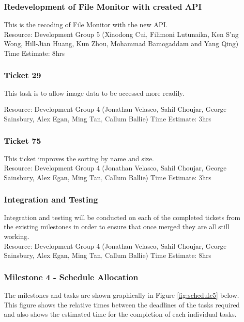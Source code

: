 \documentclass{article}
\begin{document}
\subsubsection{Redevelopment of File Monitor with created API}
	This is the recoding of File Monitor with the new API.\\
	
	Resource: Development Group 5 (Xiaodong Cui, Filimoni Lutunaika, Ken S'ng Wong, Hill-Jian Huang, Kun Zhou, Mohammad Bamogaddam and Yang Qing)
	Time Estimate: 8hrs
	
\subsubsection{Ticket 29}
	This task is to allow image data to be accessed more readily.
	
	Resource: Development Group 4 (Jonathan Velasco, Sahil Choujar, George Sainsbury, Alex Egan, Ming Tan, Callum Ballie)
	Time Estimate: 3hrs

\subsubsection{Ticket 75}
	This ticket improves the sorting by name and size.\\
	
	Resource: Development Group 4 (Jonathan Velasco, Sahil Choujar, George Sainsbury, Alex Egan, Ming Tan, Callum Ballie)
	Time Estimate: 3hrs

\subsubsection{Integration and Testing}
	Integration and testing will be conducted on each of the completed tickets from the existing milestones in order to ensure that once merged they are all still working.\\
	
	Resource: Development Group 4 (Jonathan Velasco, Sahil Choujar, George Sainsbury, Alex Egan, Ming Tan, Callum Ballie)
	Time Estimate: 8hrs

\subsubsection{Milestone 4 - Schedule Allocation}

The milestones and tasks are shown graphically in Figure \ref{fig:schedule5} below. This figure shows the relative times between the deadlines of the tasks required and also shows the estimated time for the completion of each individual tasks.\\
\end{document}
